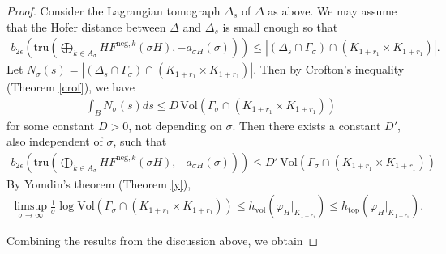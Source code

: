 \documentclass[12pt]{amsart}
\theoremstyle{definition}
\begin{document}
\begin{proof}
Consider the Lagrangian tomograph $\Delta_s$ of $\Delta$ as above. We may assume that the Hofer distance between $\Delta$ and $\Delta_s$ is small enough so that  
    \begin{align*}
       b_{2\epsilon} \left( \textrm{tru}\left(\bigoplus_{k \in A_\sigma}HF^{\textrm{neg},k}(\sigma H),-a_{\sigma H}(\sigma)\right) \right) \leq | (\Delta_s \cap \Gamma_{\sigma}) \cap (K_{1+r_1} \times K_{1+r_1})|.
    \end{align*}
Let $N_{\sigma}(s) = | (\Delta_s \cap \Gamma_{\sigma}) \cap (K_{1+r_1} \times K_{1+r_1})|$. Then by Crofton's inequality (Theorem \ref{crof}), we have
    \begin{align*}
        \int_B N_{\sigma}(s) ds \leq D \,\textrm{Vol}(\Gamma_{\sigma} \cap(K_{1+r_1} \times K_{1+r_1}))
    \end{align*}
    for some constant $D>0$, not depending on $\sigma$. Then there exists a constant $D'$, also independent of $\sigma$, such that
    \begin{align}\label{a1}
    b_{2\epsilon} \left( \textrm{tru}\left(\bigoplus_{k \in A_\sigma}HF^{\textrm{neg},k}(\sigma H),-a_{\sigma H}(\sigma)\right) \right) \leq D' \,\textrm{Vol}(\Gamma_{\sigma} \cap(K_{1+r_1} \times K_{1+r_1}))
    \end{align}
   By Yomdin's theorem (Theorem \ref{y}), 
   \begin{align}\label{yy}
       \limsup_{\sigma \to \infty} \frac{1}{\sigma} \log \textrm{Vol}\left( \Gamma_\sigma \cap(K_{1+r_1} \times K_{1+r_1}) \right)
      \leq h_{\textrm{vol}}(\varphi_H|_{K_{1+r_1} })
      \leq h_{\textrm{top}}( \varphi_{H}|_{K_{1+r_1} }).
   \end{align}

\vspace{0.2cm}

Combining the results from the discussion above, we obtain


\end{proof}
\end{document}
